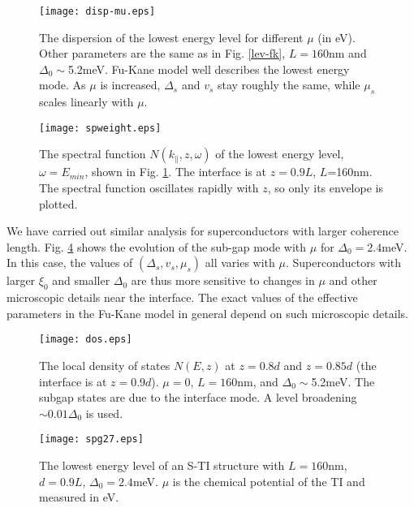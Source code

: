 \documentclass[11pt,revtex,aps]{report}
\begin{document}
\begin{figure}
\center
\texttt{[image: disp-mu.eps]}
\caption{The dispersion of the lowest energy level
for different $\mu$ (in eV). Other parameters
are the same as in Fig. \ref{lev-fk}, $L=160$nm and $\Delta_0\sim$5.2meV. Fu-Kane model
well describes the lowest energy mode. As $\mu$ is increased, 
$\Delta_s$ and $v_s$ stay roughly the same, while $\mu_s$ scales
linearly with $\mu$.
}\label{lev-chem}
\end{figure}

\begin{figure}
\center
\texttt{[image: spweight.eps]}
\caption{The spectral function $N(k_\parallel,z,\omega)$ of the lowest 
energy level, $\omega=E_{min}$, shown in Fig. \ref{lev-chem}. 
The interface is at $z=0.9L$, $L$=160nm.
The spectral function oscillates rapidly with $z$, so only its envelope is plotted.
}\label{sp}
\end{figure}

We have carried out similar analysis for superconductors with larger
coherence length. Fig. \ref{level-27} shows the evolution of
the sub-gap mode with $\mu$ for $\Delta_0=2.4$meV. In this case,
the values of $(\Delta_s,v_s,\mu_s)$ all varies with $\mu$. 
Superconductors with larger $\xi_0$ and smaller $\Delta_0$ are thus more
sensitive to changes in $\mu$ and other microscopic details near
the interface. The exact values of the effective parameters 
in the Fu-Kane model in general depend on such microscopic details.

\begin{figure}
\center
\texttt{[image: dos.eps]}
\caption{The local density of states $N(E,z)$
at $z=0.8d$ and $z=0.85d$ (the interface is at $z=0.9d$).
$\mu=0$, $L=160$nm, and $\Delta_0\sim$5.2meV. The subgap
states are due to the interface mode. A level broadening
$\sim 0.01\Delta_0$ is used.
}\label{dos}
\end{figure}

\begin{figure}
\center
\texttt{[image: spg27.eps]}
\caption{The lowest energy level of an S-TI structure with $L=160$nm,
$d=0.9L$, $\Delta_0=2.4$meV. $\mu$ is the chemical potential of the TI and
measured in eV.}\label{level-27}
\end{figure}
\end{document}
